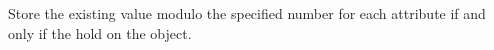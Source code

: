 Store the existing value modulo the specified number for each attribute if and
only if the  hold on the object.



